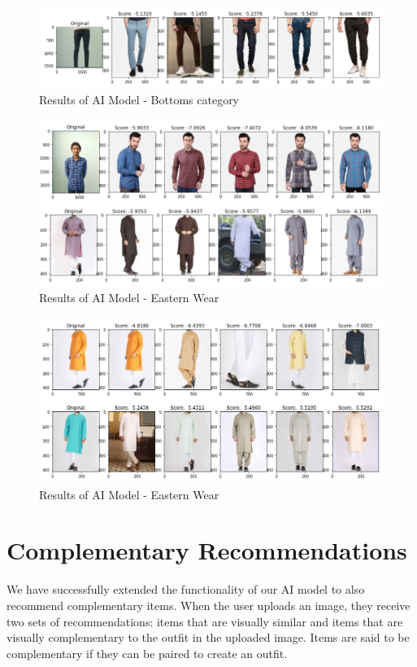 \begin{figure}[H]
\includegraphics[width=12cm]{images/Recommendations2.PNG} 
\centering
\caption{Results of AI Model - Bottoms category}
\label{architecture}
\end{figure}

\begin{figure}[H]
\includegraphics[width=12cm]{images/Recommendations3.PNG} 
\centering
\caption{Results of AI Model - Eastern Wear}
\label{architecture}
\end{figure}

\begin{figure}[H]
\includegraphics[width=12cm]{images/Recommendations4.PNG} 
\centering
\caption{Results of AI Model - Eastern Wear}
\label{architecture}
\end{figure}

\section{Complementary Recommendations}

We have successfully extended the functionality of our AI model to also recommend complementary items. When the user uploads an image, they receive two sets of recommendations: items that are visually similar and items that are visually complementary to the outfit in the uploaded image. Items are said to be complementary if they can be paired to create an outfit.

